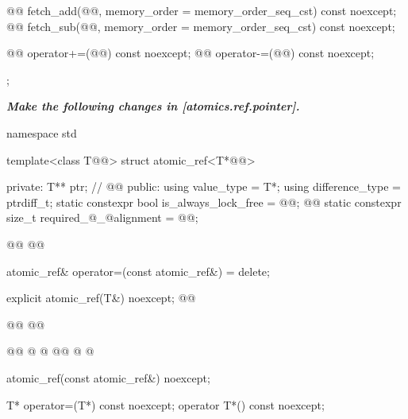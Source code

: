 \begin{codeblock}
{{    @@ fetch_add(@@,
                             memory_order = memory_order_seq_cst) const noexcept;
    @@ fetch_sub(@@,
                             memory_order = memory_order_seq_cst) const noexcept;

    @@ operator+=(@@) const noexcept;
    @@ operator-=(@@) const noexcept;
  };
}
\end{codeblock}

\textbf{\textit{Make the following changes in [atomics.ref.pointer].}} \\

\begin{codeblock}
namespace std {
  template<class T@@> struct atomic_ref<T*@@> {
  private:
    T** ptr;              // \expos
    @@
  public:
    using value_type = T*;
    using difference_type = ptrdiff_t;
    static constexpr bool is_always_lock_free = @@;
    @@
    static constexpr size_t required_@_@alignment = @@;

    @@
    @@

    atomic_ref& operator=(const atomic_ref&) = delete;

    explicit atomic_ref(T&) noexcept;
    @@
   
    @@
    @@
    
    @@
    @  @
    @@
    @  @

    atomic_ref(const atomic_ref&) noexcept;

    T* operator=(T*) const noexcept;
    operator T*() const noexcept;

}}
\end{codeblock}
